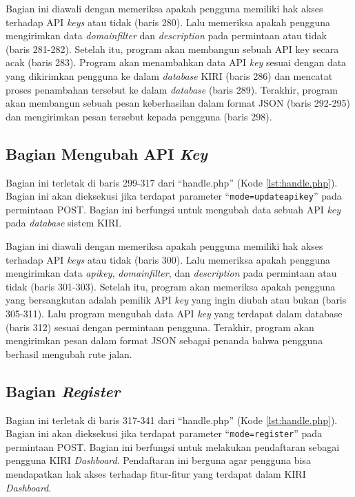 Bagian ini diawali dengan memeriksa apakah pengguna memiliki hak akses terhadap API \textit{keys} atau tidak (baris 280). Lalu memeriksa apakah pengguna mengirimkan data \textit{domainfilter} dan \textit{description} pada permintaan atau tidak (baris 281-282). Setelah itu, program akan membangun sebuah API key secara acak (baris 283). Program akan menambahkan data API \textit{key} sesuai dengan data yang dikirimkan pengguna ke dalam \textit{database} KIRI (baris 286) dan mencatat proses penambahan tersebut ke dalam \textit{database} (baris 289). Terakhir, program akan membangun sebuah pesan keberhasilan dalam format JSON (baris 292-295) dan mengirimkan pesan tersebut kepada pengguna (baris 298).

\subsection{Bagian Mengubah API \textit{Key}}
\label{sec:ubahapikey}
Bagian ini terletak di baris 299-317 dari ``handle.php'' (Kode \ref{lst:handle.php}). Bagian ini akan dieksekusi jika terdapat parameter ``\texttt{mode=updateapikey}'' pada permintaan POST. Bagian ini berfungsi untuk mengubah data sebuah API \textit{key} pada \textit{database} sistem KIRI.

Bagian ini diawali dengan memeriksa apakah pengguna memiliki hak akses terhadap API \textit{keys} atau tidak (baris 300). Lalu memeriksa apakah pengguna mengirimkan data \textit{apikey}, \textit{domainfilter}, dan \textit{description} pada permintaan atau tidak (baris 301-303). Setelah itu, program akan memeriksa apakah pengguna yang bersangkutan adalah pemilik API \textit{key} yang ingin diubah atau bukan (baris 305-311). Lalu program mengubah data API \textit{key} yang terdapat dalam database (baris 312) sesuai dengan permintaan pengguna. Terakhir, program akan mengirimkan pesan dalam format JSON sebagai penanda bahwa pengguna berhasil mengubah rute jalan.

\subsection{Bagian \textit{Register}}
\label{sec:bagianregister}
Bagian ini terletak di baris 317-341 dari ``handle.php'' (Kode \ref{lst:handle.php}). Bagian ini akan dieksekusi jika terdapat parameter ``\texttt{mode=register}'' pada permintaan POST. Bagian ini berfungsi untuk melakukan pendaftaran sebagai pengguna KIRI \textit{Dashboard}. Pendaftaran ini berguna agar pengguna bisa mendapatkan hak akses terhadap fitur-fitur yang terdapat dalam KIRI \textit{Dashboard}.

